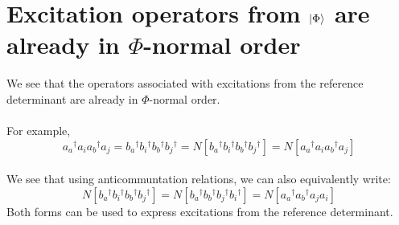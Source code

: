 \documentclass{article}
\newcommand{\kphi}{\ensuremath{\ket{\Phi}} }
\newcommand{\dg}{\ensuremath{^\dagger} }
\begin{document}
\section{Excitation operators from \kphi are already in $\Phi$-normal order}
We see that the operators associated with excitations from the reference determinant are already in $\Phi$-normal order. \\ \\
For example,
\[a_a\dg a_i a_b\dg a_j = b_a\dg b_i\dg b_b\dg b_j\dg = N[b_a\dg b_i\dg b_b\dg b_j\dg] = N[ a_a\dg a_i a_b\dg a_j ]\]
\\
We see that using anticommuntation relations, we can also equivalently write: 
 \[N[b_a\dg b_i\dg b_b\dg b_j\dg] = N[b_a\dg b_b\dg b_j\dg b_i\dg  ] = N[ a_a\dg a_b\dg  a_j a_i  ]\]
 Both forms can be used to express excitations from the reference determinant. 
\end{document}
